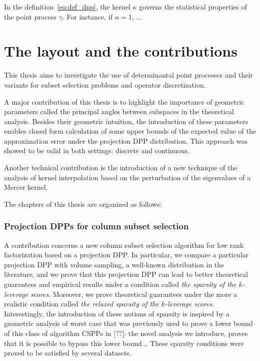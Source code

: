 \documentclass[twoside,11pt]{book}
\numberwithin{theorem}{chapter}
\numberwithin{definition}{chapter}
\numberwithin{proposition}{chapter}
\numberwithin{corollary}{chapter}
\numberwithin{example}{chapter}
\numberwithin{lemma}{chapter}
\numberwithin{assumption}{chapter}
\begin{document}
In the definition~\eqref{eq:def_dpp}, the kernel $\kappa$ governs the statistical properties of the point process $\gamma$. For instance, if $n =1$, ...


\clearpage



\section{The layout and the contributions}
This thesis aims to investigate the use of determinantal point processes and their variants for subset selection problems and operator discretization. 

A major contribution of this thesis is to highlight the importance of geometric parameters called the principal angles between subspaces in the theoretical analysis. Besides their geometric intuition, the introduction of these parameters enables closed form calculation of some upper bounds of the expected value of the approximation error under the projection DPP distribution. This approach was showed to be valid in both settings: discrete and continuous.

Another technical contribution is the introduction of a new technique of the analysis of kernel interpolation based on the perturbation of the eigenvalues of a Mercer kernel.



The chapters of this thesis are organized as follows:
\subsubsection{Projection DPPs for column subset selection}
A contribution concerns a new column subset selection algorithm for low rank factorization based on a projection DPP. 
In particular, we compare a particular projection DPP with volume sampling, a well-known distribution in the literature, and we prove that this projection DPP can lead to better theoretical guarantees and empirical results under a condition called \emph{the sparsity of the $k$-leverage scores}. Moreover, we prove theoretical guarantees under the more a realistic condition called \emph{the relaxed sparsity of the $k$-leverage scores}. Interestingly, the introduction of these notions of sparsity is inspired by a geometric analysis of worst case that was previously used to prove a lower bound of this class of algorithm CSPPs in [??]: the novel analysis we introduce, proves that it is possible to bypass this lower bound... These sparsity conditions were proved to be satisfied by several datasets. 
\end{document}
